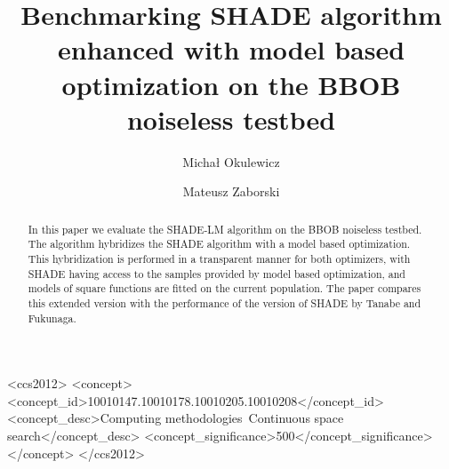 \documentclass[manuscript]{acmart}
\begin{document}
\title{Benchmarking SHADE algorithm enhanced with model based optimization on the BBOB noiseless testbed}
\renewcommand{\shorttitle}{SHADE algorithm enhanced with model based optimization on BBOB}

\author{Michał Okulewicz}
%
\author{Mateusz Zaborski}

\renewcommand{\shortauthors}{Okulewicz, Zaborski}

\begin{abstract}
 In this paper we evaluate the SHADE-LM algorithm on the BBOB noiseless testbed.
 The algorithm hybridizes the SHADE algorithm with a model based optimization.
 This hybridization is performed in a transparent manner for both optimizers,
 with SHADE having access to the samples provided by model based optimization,
 and models of square functions are fitted on the current population.
 The paper compares this extended version with the performance of the 
 version of SHADE by Tanabe and Fukunaga.
\end{abstract}


%
%
\begin{CCSXML}
<ccs2012>
<concept>
<concept_id>10010147.10010178.10010205.10010208</concept_id>
<concept_desc>Computing methodologies~Continuous space search</concept_desc>
<concept_significance>500</concept_significance>
</concept>
</ccs2012>
\end{CCSXML}


\end{document}
